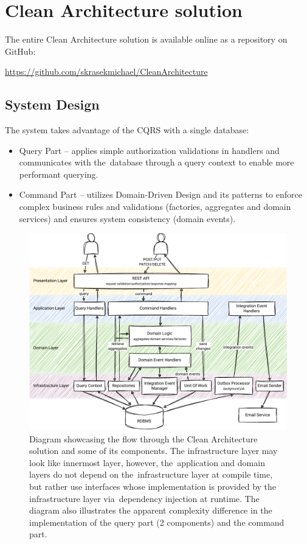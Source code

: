 \section{Clean Architecture solution}
\label{dev:clean_architecture}
The entire Clean Architecture solution is available online as a repository on GitHub:

\url{https://github.com/skrasekmichael/CleanArchitecture}

\subsection{System Design}
\label{dev:ca:deisgn}
The system takes advantage of the CQRS with a single database:
\begin{itemize}
    \item Query Part -- applies simple authorization validations in handlers and communicates with the~database through a query context to enable more performant querying.
    \item Command Part -- utilizes Domain-Driven Design and its patterns to enforce complex business rules and validations (factories, aggregates and domain services) and ensures system consistency (domain events).
\end{itemize}

\begin{figure} [H]
    \centering
    \includegraphics[width=\textwidth]{figures/ca-design.pdf}
    \caption{Diagram showcasing the flow through the Clean Architecture solution and some of its components. The infrastructure layer may look like innermost layer, however, the~application and domain layers do not depend on the~infrastructure layer at compile time, but rather use interfaces whose implementation is provided by the infrastructure layer via~dependency injection at runtime. The diagram also illustrates the apparent complexity difference in the implementation of the query part (2 components) and the command part.}
    \label{fig:ca_design}
\end{figure}

